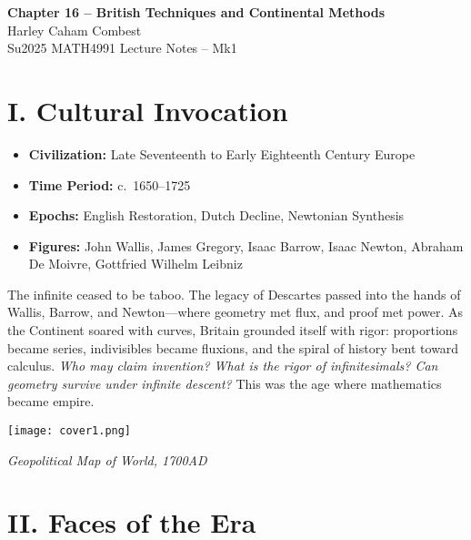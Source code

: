 \documentclass[9pt]{article}
\begin{document}
\begin{center}
\Large\textbf{Chapter 16 – British Techniques and  Continental Methods} \\
\large Harley Caham Combest \\
\large Su2025 MATH4991 Lecture Notes – Mk1
\end{center}

\vspace{1em}

\section*{I. Cultural Invocation}

\begin{itemize}
  \item \textbf{Civilization:} Late Seventeenth to Early Eighteenth Century Europe
  \item \textbf{Time Period:} c.~1650--1725
  \item \textbf{Epochs:} English Restoration, Dutch Decline, Newtonian Synthesis
  \item \textbf{Figures:} John Wallis, James Gregory, Isaac Barrow, Isaac Newton, Abraham De Moivre, Gottfried Wilhelm Leibniz
\end{itemize}

The infinite ceased to be taboo.
\vspace{1pt}
The legacy of Descartes passed into the hands of Wallis, Barrow, and Newton—where geometry met flux, and proof met power.
\vspace{1pt}
As the Continent soared with curves, Britain grounded itself with rigor: proportions became series, indivisibles became fluxions, and the spiral of history bent toward calculus.
\vspace{1pt}
\emph{Who may claim invention? What is the rigor of infinitesimals? Can geometry survive under infinite descent?}
\vspace{1pt}
This was the age where mathematics became empire.

\begin{center}
    \texttt{[image: cover1.png]}

    \textit{Geopolitical Map of World, 1700AD}
\end{center}


\newpage

\section*{II. Faces of the Era}
\end{document}
